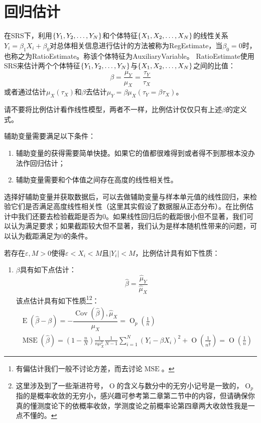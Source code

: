 \section{回归估计}
\begin{definition}
	在SRS下，利用$\{Y_1, Y_2, \dots, Y_{N}\}$和个体特征$\{X_1, X_2, \dots, X_{N}\}$的线性关系$Y_i=\beta_1X_i+\beta_0$对总体相关信息进行估计的方法被称为\gls{RegEstimate}，当$\beta_0=0$时，也称之为\gls{RatioEstimate}。称该个体特征为\gls{AuxiliaryVariable}。
	\gls{RatioEstimate}使用SRS来估计两个个体特征$\{Y_1, Y_2, \dots, Y_{N}\}$与$\{X_1, X_2, \dots, X_{N}\}$之间的比值：
	\begin{equation*}
		\beta=\frac{\mu_Y}{\mu_X}=\frac{\tau_Y}{\tau_X}
	\end{equation*}
	或者通过估计$\mu_X(\tau_X)$和$\beta$去估计$\mu_Y=\beta\mu_X(\tau_Y=\beta\tau_X)$。
\end{definition}
\begin{note}
	请不要将比例估计看作线性模型，两者不一样，比例估计仅仅只有上述$\beta$的定义式。
\end{note}
\begin{note}
	辅助变量需要满足以下条件：
	\begin{enumerate}
		\item 辅助变量的获得需要简单快捷。如果它的值都很难得到或者得不到那根本没办法作回归估计；
		\item 辅助变量需要和个体值之间存在高度的线性相关性。
	\end{enumerate}
	选择好辅助变量并获取数据后，可以去做辅助变量与样本单元值的线性回归，来检验它们是否满足高度线性相关性（这里其实假设了数据服从正态分布）。在比例估计中我们还要去检验截距是否为$0$。如果线性回归后的截距很小但不显著，我们可以认为满足要求；如果截距较大但不显著，我们认为是样本随机性带来的问题，可以认为截距满足为$0$的条件。
\end{note}
\begin{property}\label{prop:RatioEstimaor}
	若存在$\varepsilon,M>0$使得$\varepsilon<X_i<M$且$|Y_i|<M$，比例估计具有如下性质：
	\begin{enumerate}
		\item $\beta$具有如下点估计：
		\begin{equation*}
			\hat{\beta}=\frac{\hat{\mu}_Y}{\hat{\mu}_X}
		\end{equation*}
		该点估计具有如下性质\footnote{有偏估计我们一般不讨论方差，而去讨论$\operatorname{MSE}$。}\footnote{这里涉及到了一些渐进符号，$\operatorname{O}$的含义与数分中的无穷小记号是一致的，$\operatorname{O}_p$指的是概率收敛的无穷小，感兴趣可参考\cite{vander}第二章第二节中的内容，但请确保你真的懂测度论下的依概率收敛，学测度论之前概率论第四章两大收敛性我是一点不懂的。}：
		 \begin{gather*}
		 	\operatorname{E}(\hat{\beta}-\beta)=-\dfrac{\operatorname{Cov}(\hat{\beta}),\hat{\mu}_X}{\mu_X}=\operatorname{O}_p\left(\frac{1}{n}\right) \\
		 	\operatorname{MSE}(\hat{\beta})=\left(1-\frac{n}{N}\right)\frac{1}{n\mu_X^2}\frac{1}{N-1}\sum_{i=1}^{N}(Y_i-\beta X_i)^2+\operatorname{O}\left(\frac{1}{n^{\frac{3}{2}}}\right)=\operatorname{O}\left(\frac{1}{n}\right)
		 \end{gather*}
	\end{enumerate}
\end{property}
